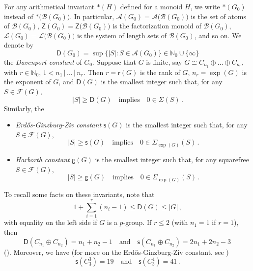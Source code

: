 \documentclass[a4paper, 10pt]{amsart}
\theoremstyle{plain}
\theoremstyle{definition}
\theoremstyle{definition}
\newcommand{\N}{\mathbb N}
\numberwithin{equation}{section}
\renewcommand{\t}{\, | \,}
\begin{document}
For any arithmetical invariant $*(H)$ defined for a monoid $H$, we write $*(G_0)$ instead of $* \big(\mathcal B (G_0)\big)$. In particular, $\mathcal A (G_0) = \mathcal A \big(\mathcal B (G_0) \big)$ is the set of atoms of $\mathcal B (G_0)$, $\mathsf Z (G_0) = \mathsf Z \big( \mathcal B (G_0) \big)$ is the factorization monoid of $\mathcal B (G_0)$, $\mathcal L (G_0)=\mathcal L \big( \mathcal B(G_0) \big)$ is the system of  length sets of $\mathcal B (G_0)$, and so on. We denote by
\[
\mathsf D (G_0) = \sup \{ |S| \colon S \in \mathcal A (G_0) \} \in \N_0 \cup \{\infty\}
\]
the {\it Davenport constant} of $G_0$.  Suppose that $G$ is finite, say $G \cong C_{n_1} \oplus \ldots \oplus C_{n_r}$, with $r \in \N_0$, $1 < n_1 \t \ldots \t n_r$. Then $r = \mathsf r (G)$ is the rank of $G$, $n_r = \exp (G)$ is the exponent of $G$, and $\mathsf D (G)$ is the smallest integer such that, for any $S \in \mathcal F (G)$,
\[
|S| \ge \mathsf D (G) \quad \text{implies} \quad 0 \in \Sigma (S) \,.
\]
Similarly, the
\begin{itemize}
\item {\it Erd{\H{o}}s-{G}inzburg-{Z}iv constant} $\mathsf s (G)$ is the smallest integer such that, for any $S \in \mathcal F (G)$,
      \[
      |S| \ge \mathsf s (G) \quad \text{implies} \quad 0 \in \Sigma_{\exp (G)} (S) \,.
      \]

\item {\it Harborth constant} $\mathsf g (G)$ is the smallest integer such that, for any squarefree $S \in \mathcal F (G)$,
      \[
      |S| \ge \mathsf g (G) \quad \text{implies} \quad 0 \in \Sigma_{\exp (G)} (S) \,.
      \]
\end{itemize}
To recall some facts on these invariants, note that
\begin{equation} \label{inequality-Davenport}
1 + \sum_{i=1}^r (n_i-1) \le \mathsf D (G) \le |G| \,,
\end{equation}
with equality on the left side if $G$ is a $p$-group.  If $r \le 2$ (with $n_1=1$ if $r=1$), then
\begin{equation} \label{davenport-rank2}
\mathsf D (C_{n_1} \oplus C_{n_2}) = n_1+n_2-1 \quad \text{and} \quad \mathsf s (C_{n_1} \oplus C_{n_2}) = 2n_1+2n_2-3 \,
\end{equation}
 (\cite[Theorem 5.8.3]{Ge-HK06a}). Moreover, we have (for more on the Erd{\H{o}}s-{G}inzburg-{Z}iv constant, see \cite{G-H-S-T07,E-E-G-K-R07,Fa-Ga-Zh11a})
\begin{equation} \label{EGZ}
 \mathsf s (C_3^3) = 19 \quad \text{and} \quad \mathsf s (C_3^4) = 41 \,.
\end{equation}
\end{document}
